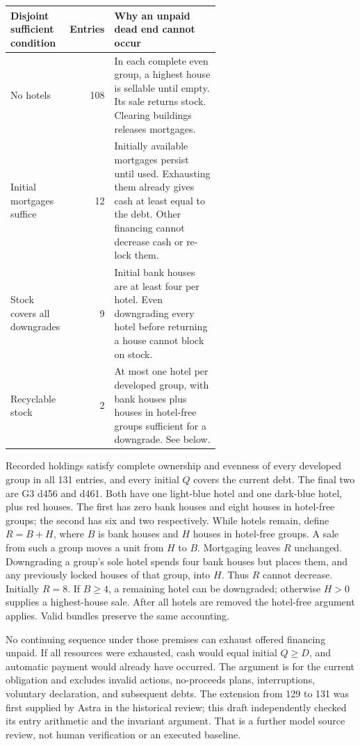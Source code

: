 \begin{center}
\begin{tabular}{@{}lrL{0.60\linewidth}@{}}\toprule
Disjoint sufficient condition & Entries & Why an unpaid dead end cannot occur\\\midrule
No hotels &108&In each complete even group, a highest house is sellable until empty. Its sale returns stock. Clearing buildings releases mortgages.\\
Initial mortgages suffice &12&Initially available mortgages persist until used. Exhausting them already gives cash at least equal to the debt. Other financing cannot decrease cash or re-lock them.\\
Stock covers all downgrades &9&Initial bank houses are at least four per hotel. Even downgrading every hotel before returning a house cannot block on stock.\\
Recyclable stock &2&At most one hotel per developed group, with bank houses plus houses in hotel-free groups sufficient for a downgrade. See below.\\\bottomrule
\end{tabular}
\end{center}

Recorded holdings satisfy complete ownership and evenness of every developed group in all 131 entries, and every initial $Q$ covers the current debt. The final two are G3 d456 and d461. Both have one light-blue hotel and one dark-blue hotel, plus red houses. The first has zero bank houses and eight houses in hotel-free groups; the second has six and two respectively. While hotels remain, define $R=B+H$, where $B$ is bank houses and $H$ houses in hotel-free groups. A sale from such a group moves a unit from $H$ to $B$. Mortgaging leaves $R$ unchanged. Downgrading a group's sole hotel spends four bank houses but places them, and any previously locked houses of that group, into $H$. Thus $R$ cannot decrease. Initially $R=8$. If $B\geq4$, a remaining hotel can be downgraded; otherwise $H>0$ supplies a highest-house sale. After all hotels are removed the hotel-free argument applies. Valid bundles preserve the same accounting.

No continuing sequence under those premises can exhaust offered financing unpaid. If all resources were exhausted, cash would equal initial $Q\geq D$, and automatic payment would already have occurred. The argument is for the current obligation and excludes invalid actions, no-proceeds plans, interruptions, voluntary declaration, and subsequent debts. The extension from 129 to 131 was first supplied by Astra in the historical review; this draft independently checked its entry arithmetic and the invariant argument. That is a further model source review, not human verification or an executed baseline.

